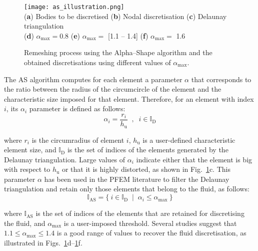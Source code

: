 \documentclass[final,3p,times]{elsarticle}
\begin{document}
\begin{figure}[t!] \captionsetup[sub]{font=normalsize}
	\centering 
	\texttt{[image: as\_illustration.png]}
	\\
	\vspace{-41mm}
	\hspace{-25mm} 
	\footnotesize{(\textbf{a}) Bodies to be discretised} 
	\hspace{15mm} 
	(\textbf{b}) Nodal discretisation
	\hspace{15mm} 
	(\textbf{c}) Delaunay triangulation
	\\
	\vspace{38mm}
	\hspace{-10mm} 
	(\textbf{d}) $\alpha_\mathrm{max} = 0.8$
	\hspace{22mm} 
	(\textbf{e}) $\alpha_\mathrm{max} = $ [1.1 -- 1.4]
	\hspace{20mm} 
	(\textbf{f}) $\alpha_\mathrm{max} = $ 1.6
	\caption{Remeshing process using the Alpha--Shape algorithm and the obtained discretisations using different values of $\alpha_\mathrm{max}$.}
	\label{Fig:AS_Iluustration}
\end{figure}


The AS algorithm computes for each element a parameter $\alpha$ that corresponds to the ratio between the radius of the circumcircle of the element and the characteristic size imposed for that element. Therefore, for an element with index $i$, its $\alpha_i$ parameter is defined as follows:
%
\begin{equation}
\alpha_i = \frac{r_i}{h_\mathrm{u}} \;\; , \;\; i \in \mathbb{I}_\mathrm{D}
\end{equation}

\noindent where $r_i$ is the circumradius of element $i$, $h_\mathrm{u}$ is a user-defined characteristic element size, and $\mathbb{I}_\mathrm{D}$ is the set of indices of the elements generated by the Delaunay triangulation. Large values of $\alpha_i$ indicate either that the element is big with respect to $h_\mathrm{u}$ or that it is highly distorted, as shown in Fig.~\ref{Fig:AS_Iluustration}c. This parameter $\alpha$ has been used in the PFEM literature to filter the Delaunay triangulation and retain only those elements that belong to the fluid, as follows:
%
\begin{equation}
\mathbb{I}_\mathrm{AS} = \{\:i \in \mathbb{I}_\mathrm{D} \; \mid \; \alpha_i \leq \alpha_\mathrm{max} \: \}
\end{equation}

\noindent where $\mathbb{I}_\mathrm{AS}$ is the set of indices of the elements that are retained for discretising the fluid, and $\alpha_\mathrm{max}$ is a user-imposed threshold. Several studies suggest that $1.1 \leq \alpha_\mathrm{max} \leq 1.4$ is a good range of values to recover the fluid discretisation, as illustrated in Figs.~\ref{Fig:AS_Iluustration}d--\ref{Fig:AS_Iluustration}f. 
\end{document}
